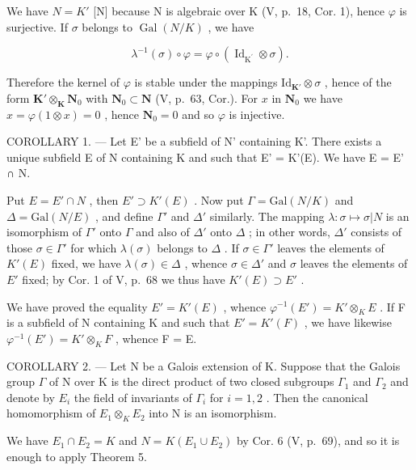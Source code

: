 We have \(N = K'\) {[}N{]} because N is algebraic over K (V, p.~18, Cor. 1), hence \(\varphi\) is surjective. If \(\sigma\) belongs to \(\operatorname{Gal}(N/K)\) , we have

\[
\lambda^ {- 1} (\sigma) \circ \varphi = \varphi \circ \left(\operatorname{Id} _ {\mathrm{K} ^ {\prime}} \otimes \sigma\right).\tag{9}
\]

Therefore the kernel of \(\varphi\) is stable under the mappings \(\mathrm{Id}_{\mathbf{K}'} \otimes \sigma\) , hence of the form \(\mathbf{K}' \otimes_{\mathbf{K}} \mathbf{N}_0\) with \(\mathbf{N}_0 \subset \mathbf{N}\) (V, p.~63, Cor.). For \(x\) in \(\mathbf{N}_0\) we have \(x = \varphi(1 \otimes x) = 0\) , hence \(\mathbf{N}_0 = 0\) and so \(\varphi\) is injective.

COROLLARY 1. --- Let E' be a subfield of N' containing K'. There exists a unique subfield E of N containing K and such that E' = K'(E). We have E = E' ∩ N.

Put \(E = E' \cap N\) , then \(E' \supset K'(E)\) . Now put \(\Gamma = \text{Gal}(N/K)\) and \(\Delta = \text{Gal}(N/E)\) , and define \(\Gamma'\) and \(\Delta'\) similarly. The mapping \(\lambda : \sigma \mapsto \sigma | N\) is an isomorphism of \(\Gamma'\) onto \(\Gamma\) and also of \(\Delta'\) onto \(\Delta\) ; in other words, \(\Delta'\) consists of those \(\sigma \in \Gamma'\) for which \(\lambda(\sigma)\) belongs to \(\Delta\) . If \(\sigma \in \Gamma'\) leaves the elements of \(K'(E)\) fixed, we have \(\lambda(\sigma) \in \Delta\) , whence \(\sigma \in \Delta'\) and \(\sigma\) leaves the elements of \(E'\) fixed; by Cor. 1 of V, p.~68 we thus have \(K'(E) \supset E'\) .

We have proved the equality \(E' = K'(E)\) , whence \(\varphi^{-1}(E') = K' \otimes_{K} E\) . If F is a subfield of N containing K and such that \(E' = K'(F)\) , we have likewise \(\varphi^{-1}(E') = K' \otimes_{K} F\) , whence F = E.

COROLLARY 2. --- Let N be a Galois extension of K. Suppose that the Galois group \(\Gamma\) of N over K is the direct product of two closed subgroups \(\Gamma_1\) and \(\Gamma_2\) and denote by \(E_i\) the field of invariants of \(\Gamma_i\) for \(i = 1, 2\) . Then the canonical homomorphism of \(E_1 \otimes_K E_2\) into N is an isomorphism.

We have \(E_{1} \cap E_{2} = K\) and \(N = K(E_{1} \cup E_{2})\) by Cor. 6 (V, p.~69), and so it is enough to apply Theorem 5.

